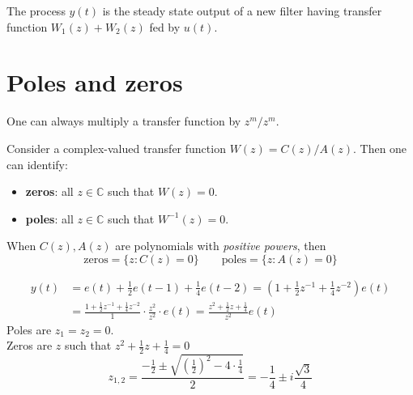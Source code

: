 \begin{figure}[htpb]
	\centering
\end{figure}
\FloatBarrier
\begin{theorem}
	The process $y(t)$ is the steady state output of a new filter having transfer function $W_{1}(z)+W_{2}(z)$ fed by $u(t)$.
\end{theorem}

\section{Poles and zeros}

\begin{obs}
	One can always multiply a transfer function by $z^{m}/z^{m}$.

	Consider a complex-valued transfer function $W(z)=C(z)/A(z)$. Then one can identify:
	\begin{itemize}
		\item \textbf{zeros}: all $z\in \mathbb{C}$ such that $W(z)=0$.
		\item \textbf{poles}: all $z\in \mathbb{C}$ such that $W^{-1} (z)=0$.
	\end{itemize}
	When $C(z),A(z)$ are polynomials with \emph{positive powers}, then
	\[
		\text{zeros}=\{z:C(z)=0\} \qquad \text{poles}=\{z:A(z)=0\}
	\]
\end{obs}
\begin{example}
\begin{align*}
y(t) &=e(t)+\frac{1}{2} e(t-1)+\frac{1}{4} e(t-2) =\left(1+\frac{1}{2} z^{-1}+\frac{1}{4} z^{-2}\right) e(t) \\
&=\frac{1+\frac{1}{2} z^{-1}+\frac{1}{4} z^{-2}}{1} \cdot \frac{z^{2}}{z^{2}}\cdot e(t) =\frac{z^{2}+\frac{1}{2} z+\frac{1}{4}}{z^{2}} e(t)
\end{align*}
Poles are $z_{1}=z_{2}=0$.\\
Zeros are $z$ such that $z^{2}+\frac{1}{2} z+\frac{1}{4}=0$
\[
	z_{1,2}=\frac{-\frac{1}{2} \pm \sqrt{\left( \frac{1}{2}  \right) ^2 -4\cdot\frac{1}{4} } }{2} = -\frac{1}{4}\pm i\frac{\sqrt{3} }{4}
\]
\end{example}

